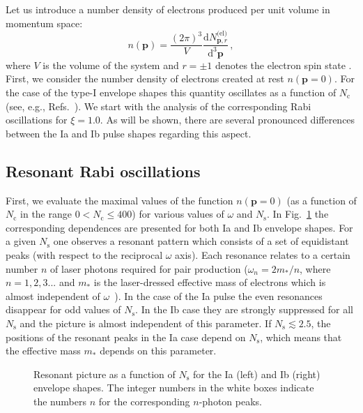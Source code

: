 \documentclass[preprint,aps,prd,showpacs,floatfix]{revtex4-1}
\begin{document}
\indent Let us introduce a number density of electrons produced per unit volume in momentum space:
%
\begin{equation}
n (\boldsymbol{p}) = \frac{(2\pi)^3}{V}\frac{\mathrm{d} N_{\boldsymbol{p}, r}^\text{(el)}}{\mathrm{d}^3 \boldsymbol{p}}\,,
\label{eq:n_notation}
\end{equation}
%
where $V$ is the volume of the system and $r=\pm 1$ denotes the electron spin state . First, we consider the number density of electrons created at rest $n (\boldsymbol{p} = 0)$. For the case of the type-I envelope shapes this quantity oscillates as a function of $N_\text{c}$ (see, e.g., Refs.~\cite{popov_1973, narozhniy_1974, avetissian_pre_2002, mocken_pra_2010}). We start with the analysis of the corresponding Rabi oscillations for $\xi=1.0$. As will be shown, there are several pronounced differences between the Ia and Ib pulse shapes regarding this aspect.
\subsection{Resonant Rabi oscillations}\label{subsec:I_rabi}
First, we evaluate the maximal values of the function $n (\boldsymbol{p} = 0)$ (as a function of $N_\text{c}$ in the range $0< N_\text{c} \leq 400$) for various values of $\omega$ and $N_\text{s}$. In Fig.~\ref{fig:res_I_to} the corresponding dependences are presented for both Ia and Ib envelope shapes. For a given $N_\text{s}$ one observes a resonant pattern which consists of a set of equidistant peaks (with respect to the reciprocal $\omega$ axis). Each resonance relates to a certain number $n$ of laser photons required for pair production ($\omega_n = 2m_*/n$, where $n=1,2,3...$ and $m_*$ is the laser-dressed effective mass of electrons which is almost independent of $\omega$~\cite{mocken_pra_2010}). In the case of the Ia pulse the even resonances disappear for odd values of $N_\text{s}$. In the Ib case they are strongly suppressed for all $N_\text{s}$ and the picture is almost independent of this parameter. If $N_\text{s} \lesssim 2.5$, the positions of the resonant peaks in the Ia case depend on $N_\text{s}$, which means that the effective mass $m_*$ depends on this parameter.
%
\begin{figure}[h]
\caption{Resonant picture as a function of $N_\text{s}$ for the Ia (left) and Ib (right) envelope shapes. The integer numbers in the white boxes indicate the numbers $n$ for the corresponding $n$-photon peaks.}
\label{fig:res_I_to}
\end{figure}
%
\end{document}
